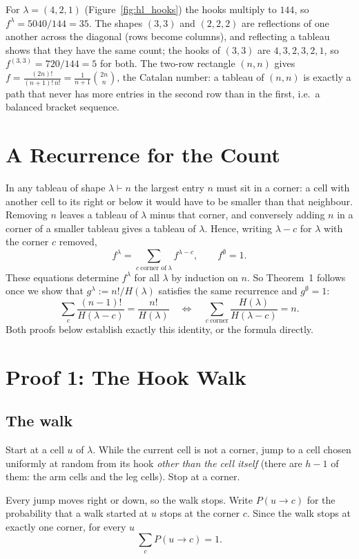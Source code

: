 \documentclass[11pt]{article}
\begin{document}
\begin{examplebox}
For $\lambda=(4,2,1)$ (Figure~\ref{fig:hl_hooks}) the hooks multiply to $144$, so $f^\lambda=5040/144=35$.
The shapes $(3,3)$ and $(2,2,2)$ are reflections of one another across the diagonal (rows become columns), and reflecting a tableau shows that they have the same count;
the hooks of $(3,3)$ are $4,3,2,3,2,1$, so $f^{(3,3)}=720/144=5$ for both.
The two-row rectangle $(n,n)$ gives $f=\frac{(2n)!}{(n+1)!\,n!}=\frac1{n+1}\binom{2n}{n}$, the Catalan number: a tableau of $(n,n)$ is exactly a path that
never has more entries in the second row than in the first, i.e.\ a balanced bracket sequence.
\end{examplebox}

\section{A Recurrence for the Count}
In any tableau of shape $\lambda\vdash n$ the largest entry $n$ must sit in a corner: a cell with another cell to its right or below it would have to be smaller than that neighbour.
Removing $n$ leaves a tableau of $\lambda$ minus that corner, and conversely adding $n$ in a corner of a smaller tableau gives a tableau of $\lambda$. Hence, writing $\lambda-c$ for $\lambda$ with the corner $c$ removed,
\begin{equation}\label{eq:rec}
  f^\lambda=\sum_{c\ \text{corner of}\ \lambda}f^{\lambda-c},\qquad f^{\emptyset}=1.
\end{equation}
These equations determine $f^\lambda$ for all $\lambda$ by induction on $n$. So Theorem~1 follows once we show that $g^\lambda:=n!/H(\lambda)$ satisfies the same recurrence and $g^\emptyset=1$:
\begin{equation}\label{eq:goal}
  \sum_{c}\frac{(n-1)!}{H(\lambda-c)}=\frac{n!}{H(\lambda)}
  \quad\Longleftrightarrow\quad
  \sum_{c\ \text{corner}}\frac{H(\lambda)}{H(\lambda-c)}=n .
\end{equation}
Both proofs below establish exactly this identity, or the formula directly.

\section{Proof 1: The Hook Walk}
\subsection{The walk}
\begin{definitionbox}
Start at a cell $u$ of $\lambda$. While the current cell is not a corner, jump to a cell chosen uniformly at random from its hook \emph{other than the cell itself} (there are $h-1$ of them: the arm cells and the leg cells).
Stop at a corner.
\end{definitionbox}
Every jump moves right or down, so the walk stops. Write $P(u\to c)$ for the probability that a walk started at $u$ stops at the corner $c$. Since the walk stops at exactly one corner, for every $u$
\begin{equation}\label{eq:one}
  \sum_{c}P(u\to c)=1 .
\end{equation}
\end{document}
